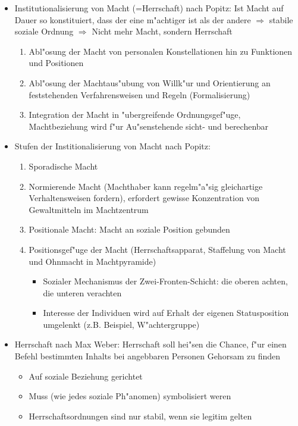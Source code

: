 \begin{itemize}
	\item Institutionalisierung von Macht (=Herrschaft) nach Popitz:
		Ist Macht auf Dauer so konstituiert, dass der eine m"achtiger ist als der andere $\Rightarrow$ stabile soziale Ordnung $\Rightarrow$ Nicht mehr Macht, sondern Herrschaft
		\begin{enumerate}
			\item
				Abl"osung der Macht von personalen Konstellationen hin zu Funktionen und Positionen
			\item
				Abl"osung der Machtaus"ubung von Willk"ur und Orientierung an feststehenden Verfahrensweisen und Regeln (Formalisierung)
			\item
				Integration der Macht in "ubergreifende Ordnungsgef"uge, Machtbeziehung wird f"ur Au"senstehende sicht- und berechenbar
		\end{enumerate}

	\item
		Stufen der Institionalisierung von Macht nach Popitz:
		\begin{enumerate}
			\item
				Sporadische Macht
			\item
				Normierende Macht (Machthaber kann regelm"a"sig gleichartige Verhaltensweisen fordern), erfordert gewisse Konzentration von Gewaltmitteln im Machtzentrum
			\item
				Positionale Macht: Macht an soziale Position gebunden
			\item
				Positionsgef"uge der Macht (Herrschaftsapparat, Staffelung von Macht und Ohnmacht in Machtpyramide)
				\begin{itemize}
					\item
						Sozialer Mechanismus der Zwei-Fronten-Schicht: die oberen achten, die unteren verachten
					\item
						Interesse der Individuen wird auf Erhalt der eigenen Statusposition umgelenkt (z.B. Beispiel, W"achtergruppe)
				\end{itemize}
		\end{enumerate}
	\item
		Herrschaft nach Max Weber: Herrschaft soll hei"sen die Chance, f"ur einen Befehl bestimmten Inhalts bei angebbaren Personen Gehorsam zu finden
		\begin{itemize}
			\item
				Auf soziale Beziehung gerichtet
			\item
				Muss (wie jedes soziale Ph"anomen) symbolisiert weren
			\item
				Herrschaftsordnungen sind nur stabil, wenn sie legitim gelten
		\end{itemize}


\end{itemize}
